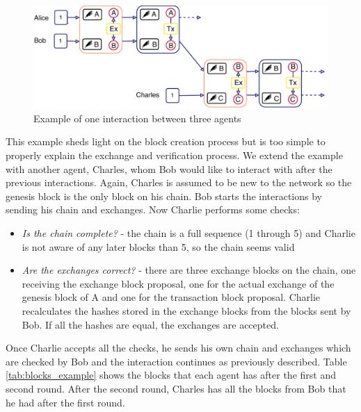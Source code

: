 \begin{figure}
    \centering
    \includegraphics[width=\textwidth]{images/trustchain_example.pdf}
    \caption{Example of one interaction between three agents}
    \label{fig:exchange_example}
\end{figure}

This example sheds light on the block creation process but is too simple to properly explain the 
exchange and verification process. We extend the example with another agent, Charles, whom Bob would
like to interact with after the previous interactions. Again, Charles is assumed to be new to the 
network so the genesis block is the only block on his chain. Bob starts the interactions by sending
his chain and exchanges. Now Charlie performs some checks: 

\begin{itemize}
    \item \textit{Is the chain complete?} - the chain is a full sequence (1 through 5) and Charlie 
    is not aware of any later blocks than 5, so the chain seems valid
    \item \textit{Are the exchanges correct?} - there are three exchange blocks on the chain, one
    receiving the exchange block proposal, one for the actual exchange of the genesis block of A and
    one for the transaction block proposal. Charlie recalculates the hashes stored in the exchange 
    blocks from the blocks sent by Bob. If all the hashes are equal, the exchanges are accepted.
\end{itemize}

Once Charlie accepts all the checks, he sends his own chain and exchanges which are checked by Bob
and the interaction continues as previously described. Table \ref{tab:blocks_example} shows the
blocks that each agent has after the first and second round. After the second round, Charles has 
all the blocks from Bob that he had after the first round.

